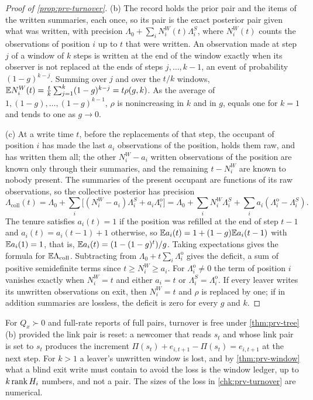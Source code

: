 \begin{proof}[Proof of \cref{prop:prv-turnover}]
(b) The record holds the prior pair and the items of the written summaries, each once, so its pair is the exact posterior pair given what was written, with precision $\Lambda_0+\sum_iN^W_i(t)\Lambda^S_i$, where $N^W_i(t)$ counts the observations of position $i$ up to $t$ that were written. An observation made at step $j$ of a window of $k$ steps is written at the end of the window exactly when its observer is not replaced at the ends of steps $j,\dots,k-1$, an event of probability $(1-g)^{k-j}$. Summing over $j$ and over the $t/k$ windows, $\mathbb{E} N^W_i(t)=\frac tk\sum_{j=1}^k(1-g)^{k-j}=t\rho(g,k)$. As the average of $1,(1-g),\dots,(1-g)^{k-1}$, $\rho$ is nonincreasing in $k$ and in $g$, equals one for $k=1$ and tends to one as $g\to0$.

(c) At a write time $t$, before the replacements of that step, the occupant of position $i$ has made the last $a_i$ observations of the position, holds them raw, and has written them all; the other $N^W_i-a_i$ written observations of the position are known only through their summaries, and the remaining $t-N^W_i$ are known to nobody present. The summaries of the present occupant are functions of its raw observations, so the collective posterior has precision
\[
\Lambda_{\mathrm{coll}}(t)=\Lambda_0+\sum_i\bigl[(N^W_i-a_i)\Lambda^S_i+a_i\Lambda^{\mathrm o}_i\bigr]=\Lambda_0+\sum_iN^W_i\Lambda^S_i+\sum_ia_i(\Lambda^{\mathrm o}_i-\Lambda^S_i).
\]
The tenure satisfies $a_i(t)=1$ if the position was refilled at the end of step $t-1$ and $a_i(t)=a_i(t-1)+1$ otherwise, so $\mathbb{E} a_i(t)=1+(1-g)\mathbb{E} a_i(t-1)$ with $\mathbb{E} a_i(1)=1$, that is, $\mathbb{E} a_i(t)=(1-(1-g)^t)/g$. Taking expectations gives the formula for $\mathbb{E}\Lambda_{\mathrm{coll}}$. Subtracting from $\Lambda_0+t\sum_i\Lambda^{\mathrm o}_i$ gives the deficit, a sum of positive semidefinite terms since $t\ge N^W_i\ge a_i$. For $\Lambda^{\mathrm o}_i\ne0$ the term of position $i$ vanishes exactly when $N^W_i=t$ and either $a_i=t$ or $\Lambda^S_i=\Lambda^{\mathrm o}_i$. If every leaver writes its unwritten observations on exit, then $N^W_i=t$ and $\rho$ is replaced by one; if in addition summaries are lossless, the deficit is zero for every $g$ and $k$.
\end{proof}

\begin{remark}\label{rem:prv-turnover-dynamic}
For $Q_x\succ0$ and full-rate reports of full pairs, turnover is free under \cref{thm:prv-tree}(b) provided the link pair is reset: a newcomer that reads $s_t$ and whose link pair is set to $s_t$ produces the increment $\Pi(s_t)+e_{i,t+1}-\Pi(s_t)=e_{i,t+1}$ at the next step. For $k>1$ a leaver's unwritten window is lost, and by \cref{thm:prv-window} what a blind exit write must contain to avoid the loss is the window ledger, up to $k\operatorname{rank} H_i$ numbers, and not a pair. The sizes of the loss in \cref{chk:prv-turnover} are numerical.
\end{remark}

